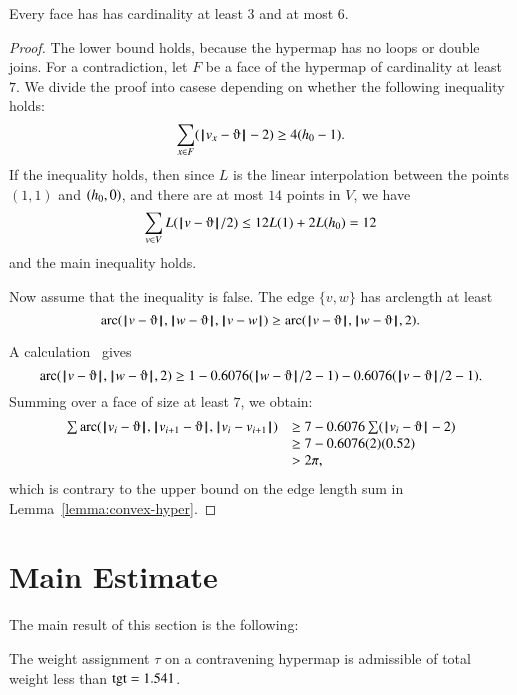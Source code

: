\begin{lemma}  
Every face has has cardinality at least $3$ and at most $6$.
\end{lemma}

\begin{proof} The lower bound holds, because the hypermap has no loops or double joins.  For a contradiction, let $F$ be a face of the hypermap of cardinality at least $7$.  We divide the proof into casese depending on whether the
following inequality holds:
$$
\sum _{x\in F} (\norm{v_x}{\orgn}-2) \ge 4(\hm-1).
$$
If the inequality holds, then since $L$ is the linear interpolation between the points $(1,1)$ and $({h_0},0)$, and there are at most $14$ points in $V$, we have
$$\sum_{v\in V}L(\norm{v}{\orgn}/2) \le 12 L(1) + 2 L(\hm) =12$$
and the main inequality holds.

Now assume that the inequality is false.
The edge $\{v,w\}$ has arclength at least
$$
\arc(\norm{v}{\orgn},\norm{w}{\orgn},\norm{v}{w}) \ge \arc(\norm{v}{\orgn},\norm{w}{\orgn},2). 
$$

A calculation~\cite[cc:arc]{hales:2009:nonlinear} gives
$$\arc(\norm{v}{\orgn},\norm{w}{\orgn},2)\ge 1 - 0.6076 (\norm{w}{\orgn}/2 - 1) - 0.6076 (\norm{v}{\orgn}/2 - 1).$$ %
Summing over a face of size at least $7$, we obtain:
$$
\begin{array}{lll}
\sum \arc(\norm{v_i}{\orgn},\norm{v_{i+1}}{\orgn},\norm{v_i}{v_{i+1}})&\ge
7 - 0.6076 \sum (\norm{v_i}{\orgn}-2) \\
   &\ge 7 - 0.6076 (2) (0.52) \\
   &> 2\pi,
\end{array}
$$
which is contrary to the upper bound on the edge length
sum in Lemma~\ref{lemma:convex-hyper}.
\end{proof}



\section{Main Estimate}\label{sec:weight}


The main result of this section is the following:

\begin{theorem}  %
The weight assignment $\tau$ on a contravening hypermap is admissible of  total weight less than ${\operatorname{tgt}}=1.541$.
\end{theorem}


\label{sec:admissibility}



